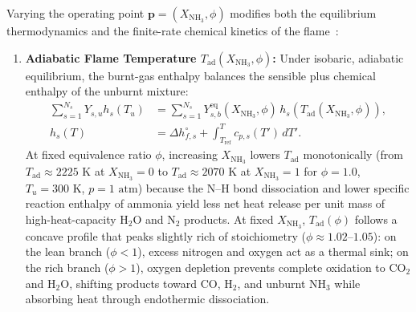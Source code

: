 Varying the operating point $\mathbf{p} = (X_{\text{NH}_3}, \phi)$ modifies both the equilibrium thermodynamics and the finite-rate chemical kinetics of the flame~\cite{valera2018ammonia, kobayashi2019science, hayakawa2015laminar, okafor2018experimental}:

\begin{enumerate}
    \item \textbf{Adiabatic Flame Temperature $T_{\text{ad}}(X_{\text{NH}_3}, \phi)$:} Under isobaric, adiabatic equilibrium, the burnt-gas enthalpy balances the sensible plus chemical enthalpy of the unburnt mixture:
    \begin{equation}
    \begin{aligned}
        \sum_{s=1}^{N_s} Y_{s,u} h_s(T_u) &= \sum_{s=1}^{N_s} Y_{s,b}^{\text{eq}}(X_{\text{NH}_3}, \phi) \, h_s\!\left(T_{\text{ad}}(X_{\text{NH}_3}, \phi)\right), \\
        h_s(T) &= \Delta h_{f,s}^\circ + \int_{T_{\text{ref}}}^T c_{p,s}(T') \, dT'.
    \end{aligned}
    \label{eq:bg_tad_balance}
    \end{equation}
    At fixed equivalence ratio $\phi$, increasing $X_{\text{NH}_3}$ lowers $T_{\text{ad}}$ monotonically (from $T_{\text{ad}} \approx 2225\text{ K}$ at $X_{\text{NH}_3}=0$ to $T_{\text{ad}} \approx 2070\text{ K}$ at $X_{\text{NH}_3}=1$ for $\phi=1.0$, $T_u=300\text{ K}$, $p=1\text{ atm}$) because the N--H bond dissociation and lower specific reaction enthalpy of ammonia yield less net heat release per unit mass of high-heat-capacity $\text{H}_2\text{O}$ and $\text{N}_2$ products. At fixed $X_{\text{NH}_3}$, $T_{\text{ad}}(\phi)$ follows a concave profile that peaks slightly rich of stoichiometry ($\phi \approx 1.02\text{--}1.05$): on the lean branch ($\phi < 1$), excess nitrogen and oxygen act as a thermal sink; on the rich branch ($\phi > 1$), oxygen depletion prevents complete oxidation to $\text{CO}_2$ and $\text{H}_2\text{O}$, shifting products toward $\text{CO}$, $\text{H}_2$, and unburnt $\text{NH}_3$ while absorbing heat through endothermic dissociation.


\end{enumerate}
